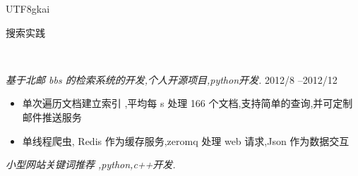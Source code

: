 \documentclass[9pt]{article}
\newenvironment{changemargin}[2]{%
  \begin{list}{}{%
    \setlength{\topsep}{0pt}%
    \setlength{\leftmargin}{#1}%
    \setlength{\rightmargin}{#2}%
    \setlength{\listparindent}{\parindent}%
    \setlength{\itemindent}{\parindent}%
    \setlength{\parsep}{\parskip}%
  }%
  \item[]}{\end{list}
}
\newcommand{\lineover}{
	\begin{changemargin}{-0.05in}{-0.05in}
		\vspace*{-8pt}
		\hrulefill \\
		\vspace*{-2pt}
	\end{changemargin}
}
\newcommand{\header}[1]{
	\begin{changemargin}{-0.5in}{-0.5in}
		\scshape{#1}\\
  	\lineover
	\end{changemargin}
}
\newenvironment{body} {
	\vspace*{-16pt}
	\begin{changemargin}{-0.25in}{-0.5in}
  }	
	{\end{changemargin}
}
\begin{document}
\begin{CJK}{UTF8}{gkai}
\begin{body}
	
	
\end{body}

\smallskip

\header{搜索实践}

\begin{body}
	\vspace{14pt}
	
 	\emph{基于北邮 bbs 的检索系统的开发,个人开源项目,python开发.} \hfill {2012/8 –2012/12}\\
	\vspace*{-4pt}
	\begin{itemize} \itemsep -0pt
		\item  单次遍历文档建立索引 ,平均每 s 处理 166 个文档,支持简单的查询,并可定制邮件推送服务
		\item 单线程爬虫, Redis 作为缓存服务,zeromq 处理 web 请求,Json 作为数据交互
	\end{itemize}
	
	\emph{小型网站关键词推荐 ,python,c++开发.} \\
	\vspace*{-4pt}
	\begin{itemize} \itemsep -0pt


\end{itemize}
\end{body}
\end{CJK}
\end{document}
